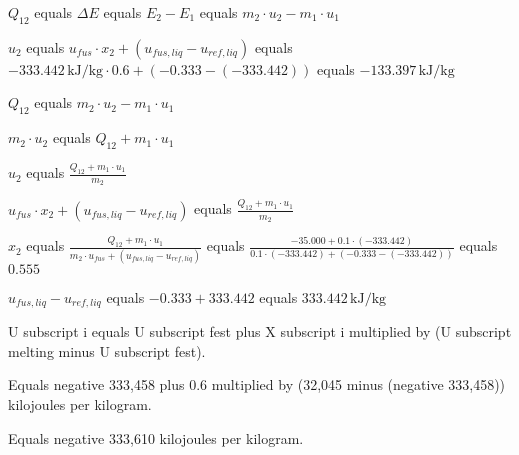 \( Q_{12} \) equals \( \Delta E \)  
equals \( E_2 - E_1 \)  
equals \( m_2 \cdot u_2 - m_1 \cdot u_1 \)  

\( u_2 \) equals \( u_{fus} \cdot x_2 + (u_{fus,liq} - u_{ref,liq}) \)  
equals \( -333.442 \, \text{kJ/kg} \cdot 0.6 + (-0.333 - (-333.442)) \)  
equals \( -133.397 \, \text{kJ/kg} \)  

\( Q_{12} \) equals \( m_2 \cdot u_2 - m_1 \cdot u_1 \)  

\( m_2 \cdot u_2 \) equals \( Q_{12} + m_1 \cdot u_1 \)  

\( u_2 \) equals \( \frac{Q_{12} + m_1 \cdot u_1}{m_2} \)  

\( u_{fus} \cdot x_2 + (u_{fus,liq} - u_{ref,liq}) \) equals \( \frac{Q_{12} + m_1 \cdot u_1}{m_2} \)  

\( x_2 \) equals \( \frac{Q_{12} + m_1 \cdot u_1}{m_2 \cdot u_{fus} + (u_{fus,liq} - u_{ref,liq})} \)  
equals \( \frac{-35.000 + 0.1 \cdot (-333.442)}{0.1 \cdot (-333.442) + (-0.333 - (-333.442))} \)  
equals \( 0.555 \)  

\( u_{fus,liq} - u_{ref,liq} \) equals \( -0.333 + 333.442 \)  
equals \( 333.442 \, \text{kJ/kg} \)

U subscript i equals U subscript fest plus X subscript i multiplied by (U subscript melting minus U subscript fest).  

Equals negative 333,458 plus 0.6 multiplied by (32,045 minus (negative 333,458)) kilojoules per kilogram.  

Equals negative 333,610 kilojoules per kilogram.